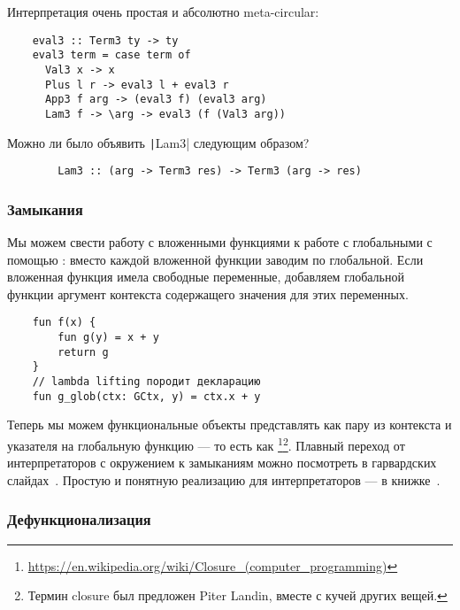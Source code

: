 Интерпретация очень простая и абсолютно meta-circular:
\begin{verbatim}
    eval3 :: Term3 ty -> ty
    eval3 term = case term of
      Val3 x -> x
      Plus l r -> eval3 l + eval3 r
      App3 f arg -> (eval3 f) (eval3 arg)
      Lam3 f -> \arg -> eval3 (f (Val3 arg))
\end{verbatim}

\begin{task}
    Можно ли было объявить \texttt|Lam3| следующим образом?
    \begin{verbatim}
        Lam3 :: (arg -> Term3 res) -> Term3 (arg -> res)
    \end{verbatim}
\end{task}

\subsubsection{Замыкания} \label{subsubsec:closures}


Мы можем свести работу с вложенными функциями к работе с глобальными с помощью : вместо каждой вложенной функции заводим по глобальной.
Если вложенная функция имела свободные переменные, добавляем глобальной функции аргумент контекста содержащего значения для этих переменных.
\begin{verbatim}
    fun f(x) {
        fun g(y) = x + y
        return g
    }
    // lambda lifting породит декларацию
    fun g_glob(ctx: GCtx, y) = ctx.x + y
\end{verbatim}

Теперь мы можем функциональные объекты представлять как пару из контекста и указателя на глобальную функцию --- то есть как \footnote{\url{https://en.wikipedia.org/wiki/Closure_(computer_programming)}}\footnote{Термин closure был предложен Piter Landin, вместе с кучей других вещей.}.
Плавный переход от интерпретаторов с окружением к замыканиям можно посмотреть в гарвардских слайдах~\cite{closures-slides}.
Простую и понятную реализацию для интерпретаторов --- в книжке~\cite[глава 11]{nystrom2021crafting}.

\subsubsection{Дефункционализация} \label{subsubsec:defunctionalization}

